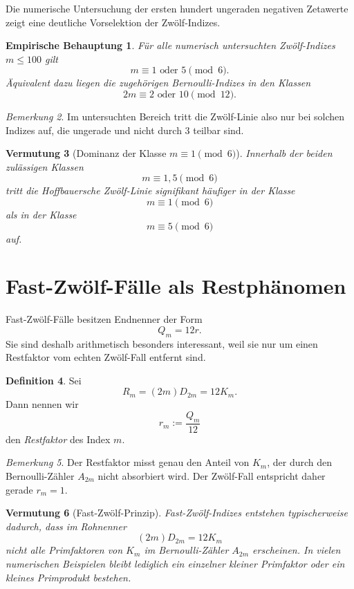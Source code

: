\documentclass[11pt,a4paper]{article}
\theoremstyle{definition}
\newtheorem{definition}{Definition}[section]
\theoremstyle{plain}
\newtheorem{vermutung}[definition]{Vermutung}
\newtheorem{empirischebehauptung}[definition]{Empirische Behauptung}
\theoremstyle{remark}
\newtheorem{bemerkung}[definition]{Bemerkung}
\begin{document}
Die numerische Untersuchung der ersten hundert ungeraden negativen Zetawerte zeigt eine deutliche Vorselektion der Zwölf-Indizes.

\begin{empirischebehauptung}
Für alle numerisch untersuchten Zwölf-Indizes $m\le 100$ gilt
\[
m\equiv 1 \text{ oder } 5 \pmod 6.
\]
Äquivalent dazu liegen die zugehörigen Bernoulli-Indizes in den Klassen
\[
2m\equiv 2 \text{ oder } 10 \pmod{12}.
\]
\end{empirischebehauptung}

\begin{bemerkung}
Im untersuchten Bereich tritt die Zwölf-Linie also nur bei solchen Indizes auf, die ungerade und nicht durch $3$ teilbar sind.
\end{bemerkung}

\begin{vermutung}[Dominanz der Klasse \texorpdfstring{$m\equiv 1\pmod 6$}{m ≡ 1 mod 6}]
Innerhalb der beiden zulässigen Klassen
\[
m\equiv 1,5 \pmod 6
\]
tritt die Hoffbauersche Zwölf-Linie signifikant häufiger in der Klasse
\[
m\equiv 1\pmod 6
\]
als in der Klasse
\[
m\equiv 5\pmod 6
\]
auf.
\end{vermutung}

\section{Fast-Zwölf-Fälle als Restphänomen}

Fast-Zwölf-Fälle besitzen Endnenner der Form
\[
Q_m=12r.
\]
Sie sind deshalb arithmetisch besonders interessant, weil sie nur um einen Restfaktor vom echten Zwölf-Fall entfernt sind.

\begin{definition}
Sei
\[
R_m=(2m)D_{2m}=12K_m.
\]
Dann nennen wir
\[
r_m:=\frac{Q_m}{12}
\]
den \emph{Restfaktor} des Index $m$.
\end{definition}

\begin{bemerkung}
Der Restfaktor misst genau den Anteil von $K_m$, der durch den Bernoulli-Zähler $A_{2m}$ nicht absorbiert wird. Der Zwölf-Fall entspricht daher gerade $r_m=1$.
\end{bemerkung}

\begin{vermutung}[Fast-Zwölf-Prinzip]
Fast-Zwölf-Indizes entstehen typischerweise dadurch, dass im Rohnenner
\[
(2m)D_{2m}=12K_m
\]
nicht alle Primfaktoren von $K_m$ im Bernoulli-Zähler $A_{2m}$ erscheinen. In vielen numerischen Beispielen bleibt lediglich ein einzelner kleiner Primfaktor oder ein kleines Primprodukt bestehen.
\end{vermutung}
\end{document}
